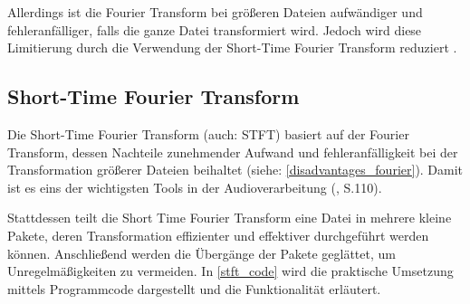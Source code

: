 \par

Allerdings ist die Fourier Transform bei größeren Dateien aufwändiger und fehleranfälliger, falls die ganze Datei transformiert wird. Jedoch wird diese Limitierung durch die Verwendung der Short-Time Fourier Transform reduziert \parencite{Prashanth_2017}.

%
\subsection{Short-Time Fourier Transform}
%

Die Short-Time Fourier Transform (auch: STFT) basiert auf der Fourier Transform, dessen Nachteile zunehmender Aufwand und fehleranfälligkeit bei der Transformation größerer Dateien beihaltet (siehe: \cref{disadvantages_fourier}). Damit ist es eins der wichtigsten Tools in der Audioverarbeitung (\cite{fundamentals_of_music_processing}, S.110).

\par

Stattdessen teilt die Short Time Fourier Transform eine Datei in mehrere kleine Pakete, deren Transformation effizienter und effektiver durchgeführt werden können. Anschließend werden die Übergänge der Pakete geglättet, um Unregelmäßigkeiten zu vermeiden. In \cref{stft_code} wird die praktische Umsetzung mittels Programmcode dargestellt und die Funktionalität erläutert.